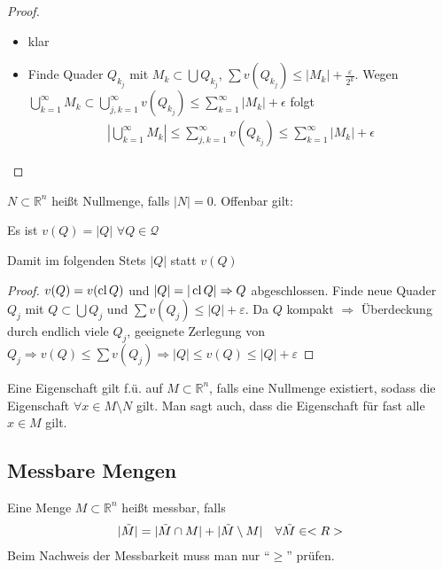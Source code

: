 \begin{proof}
	\begin{itemize}
		\item klar
		\item Finde Quader $Q_{k_j}$ mit $M_k\subset\bigcup Q_{k_j}$, $\sum v(Q_{k_j})\le\vert M_k\vert+\frac{\varepsilon}{2^k}$. Wegen $\bigcup_{k=1}^\infty M_k\subset \bigcup_{j,k=1}^\infty v(Q_{k_j}) \le \sum_{k=1}^\infty \vert M_k\vert + \epsilon$ folgt 
		\begin{align*}
		\left\vert\bigcup_{k=1}^\infty M_k\right\vert \le \sum_{j,k=1}^\infty v(Q_{k_j}) \le \sum_{k=1}^\infty \vert M_k\vert + \epsilon
		\end{align*}
	\end{itemize}
\end{proof}

\begin{*definition}[Nullmenge]
	$N\subset\mathbb{R}^n$ heißt Nullmenge, falls $\vert N \vert = 0$. Offenbar gilt:
\end{*definition}

\begin{conclusion}
	Es ist $v(Q) = \vert Q\vert$ $\forall Q\in\mathcal{Q}$
	
	Damit im folgenden Stets $\vert Q\vert$ statt $v(Q)$
\end{conclusion}
\begin{proof}
	$v(Q) = v(\cl Q)$ und $\vert Q\vert = \vert \cl Q\vert\Rightarrow Q$ abgeschlossen. Finde neue Quader $Q_j$ mit $Q\subset\bigcup Q_j$ und $\sum v(Q_j)\le\vert Q\vert+\varepsilon$. Da $Q$ kompakt $\Rightarrow$ Überdeckung durch endlich viele $Q_j$, geeignete Zerlegung von $Q_j\Rightarrow v(Q)\le\sum v(Q_j)\Rightarrow \vert Q\vert\le v(Q)\le\vert Q\vert+\varepsilon$
\end{proof}

\begin{*definition}
	Eine Eigenschaft gilt f.ü. auf $M\subset\mathbb{R}^n$, falls eine Nullmenge existiert, sodass die Eigenschaft $\forall x\in M\setminus N$ gilt. Man sagt auch, dass die Eigenschaft für fast alle $x\in M$ gilt.
\end{*definition}

\subsection{Messbare Mengen}
\begin{*definition}[messbar]
	Eine Menge $M\subset\mathbb{R}^n$ heißt messbar, falls 
	\begin{align}
		\vert \tilde{M}\vert = \vert \tilde{M}\cap M\vert + \vert \tilde{M}\setminus M\vert \quad\forall \tilde{M}\in\mathbb{R}\notag
	\end{align}
	Beim Nachweis der Messbarkeit muss man nur "`$\ge$"' prüfen.
\end{*definition}

